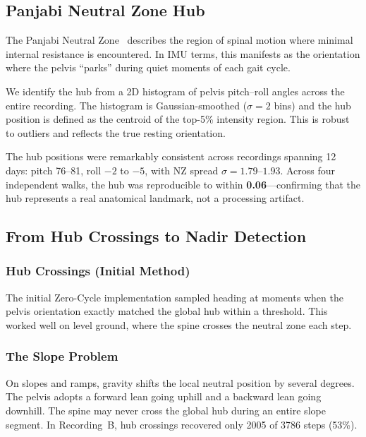 \documentclass[11pt,a4paper]{article}
\begin{document}
\subsection{Panjabi Neutral Zone Hub}

The Panjabi Neutral Zone~\cite{panjabi1992} describes the region of spinal
motion where minimal internal resistance is encountered. In IMU terms, this
manifests as the orientation where the pelvis ``parks'' during quiet moments
of each gait cycle.

We identify the hub from a 2D histogram of pelvis pitch--roll angles across
the entire recording. The histogram is Gaussian-smoothed ($\sigma = 2$ bins)
and the hub position is defined as the centroid of the top-5\% intensity
region. This is robust to outliers and reflects the true resting orientation.

The hub positions were remarkably consistent across recordings spanning 12
days: pitch 76--81\textdegree, roll $-2$ to $-5$\textdegree, with NZ spread
$\sigma = 1.79$--$1.93$\textdegree. Across four independent walks, the hub
was reproducible to within \textbf{0.06\textdegree}---confirming that the hub
represents a real anatomical landmark, not a processing artifact.

\subsection{From Hub Crossings to Nadir Detection}
\label{sec:evolution}

\subsubsection{Hub Crossings (Initial Method)}

The initial Zero-Cycle implementation sampled heading at moments when the
pelvis orientation exactly matched the global hub within a threshold. This
worked well on level ground, where the spine crosses the neutral zone each
step.

\subsubsection{The Slope Problem}

On slopes and ramps, gravity shifts the local neutral position by several
degrees. The pelvis adopts a forward lean going uphill and a backward lean
going downhill. The spine may never cross the global hub during an entire slope
segment. In Recording~B, hub crossings recovered only 2005 of 3786 steps
(53\%).
\end{document}
